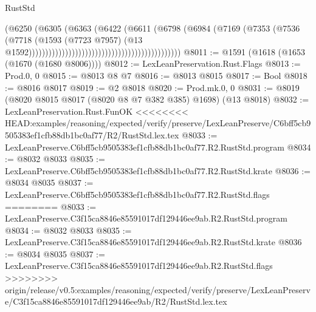 \begin{lexlean}{RustStd}
\begin{coremodule}
{\begin{coremodule}
{{{{{{{{{{{{{{{{{{{{{{{{{{{{{{{{{{{{{{{{{{{{{{{                                                                      (@6250
                                                                        (@6305
                                                                          (@6363
                                                                            (@6422
                                                                              (@6611
                                                                                (@6798
                                                                                  (@6984
                                                                                    (@7169
                                                                                      (@7353
                                                                                        (@7536
                                                                                          (@7718
                                                                                            (@1593
                                                                                              (@7723
                                                                                                @7957)
                                                                                              (@13
                                                                                                @1592))))))))))))))))))))))))))))))))))))))))))))))
@8011 := @1591 (@1618 (@1653 (@1670 (@1680 @8006))))
@8012 := LexLeanPreservation.Rust.Flags
@8013 := Prod.{0, 0}
@8015 := @8013 @8 @7
@8016 := @8013 @8015
@8017 := Bool
@8018 := @8016 @8017
@8019 := @2 @8018
@8020 := Prod.mk.{0, 0}
@8031 := @8019 (@8020 @8015 @8017 (@8020 @8 @7 @382 @385) @1698) (@13 @8018)
@8032 := LexLeanPreservation.Rust.FunOK
<<<<<<<< HEAD:examples/reasoning/expected/verify/preserve/LexLeanPreserve/C6bff5cb9505383ef1cfb88db1bc0af77/R2/RustStd.lex.tex
@8033 := LexLeanPreserve.C6bff5cb9505383ef1cfb88db1bc0af77.R2.RustStd.program
@8034 := @8032 @8033
@8035 := LexLeanPreserve.C6bff5cb9505383ef1cfb88db1bc0af77.R2.RustStd.krate
@8036 := @8034 @8035
@8037 := LexLeanPreserve.C6bff5cb9505383ef1cfb88db1bc0af77.R2.RustStd.flags
========
@8033 := LexLeanPreserve.C3f15ca8846e85591017df129446ee9ab.R2.RustStd.program
@8034 := @8032 @8033
@8035 := LexLeanPreserve.C3f15ca8846e85591017df129446ee9ab.R2.RustStd.krate
@8036 := @8034 @8035
@8037 := LexLeanPreserve.C3f15ca8846e85591017df129446ee9ab.R2.RustStd.flags
>>>>>>>> origin/release/v0.5:examples/reasoning/expected/verify/preserve/LexLeanPreserve/C3f15ca8846e85591017df129446ee9ab/R2/RustStd.lex.tex
}}}}}}}}}}}}}}}}}}}}}}}}}}}}}}}}}}}}}}}}}}}}}}}
\end{coremodule}}
\end{coremodule}
\end{lexlean}
